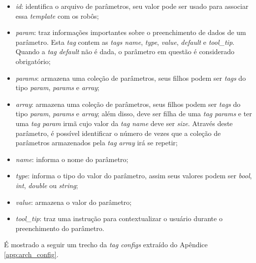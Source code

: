             \begin{itemize}
                \item \textit{id}: identifica o arquivo de parâmetros, seu valor pode ser usado para associar essa \textit{template} com os robôs;
                
                \item \textit{param}: traz informações importantes sobre o preenchimento de dados de um parâmetro. Esta \textit{tag} contem as \textit{tags name}, \textit{type}, \textit{value}, \textit{default} e \textit{tool\_tip}. Quando a \textit{tag default} não é dada, o parâmetro em questão é considerado obrigatório;
                
                \item \textit{params}: armazena uma coleção de parâmetros, seus filhos podem ser \textit{tags} do tipo \textit{param}, \textit{params} e \textit{array};
                
                \item \textit{array}: armazena uma coleção de parâmetros, seus filhos podem ser \textit{tags} do tipo \textit{param}, \textit{params} e \textit{array}; além disso, deve ser filha de uma \textit{tag params} e ter uma \textit{tag param} irmã cujo valor da \textit{tag name} deve ser \textit{size}. Através deste parâmetro, é possível identificar o número de vezes que a coleção de parâmetros armazenados pela \textit{tag array} irá se repetir;
                
                \item \textit{name}: informa o nome do parâmetro;
                
                \item \textit{type}: informa o tipo do valor do parâmetro, assim seus valores podem ser \textit{bool}, \textit{int}, \textit{double} ou \textit{string};
                
                \item \textit{value}: armazena o valor do parâmetro;
                
                \item \textit{tool\_tip}: traz uma instrução para contextualizar o usuário durante o preenchimento do parâmetro.
            \end{itemize}
            É mostrado a seguir um trecho da \textit{tag configs} extraído do Apêndice \ref{app:arch_config}.
            
